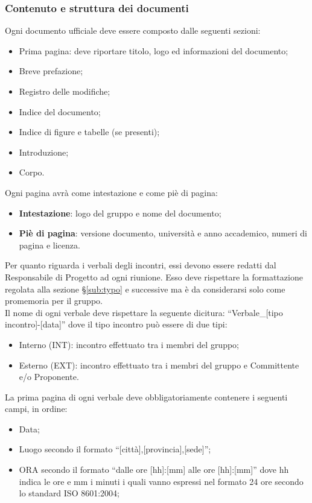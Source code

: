 {{	\subsubsection{Contenuto e struttura dei documenti}{
		\label{sub:content}
		Ogni documento ufficiale deve essere composto dalle seguenti sezioni:
		\begin{itemize}
			\item Prima pagina: deve riportare titolo, logo ed informazioni del documento;
			\item Breve prefazione;
			\item Registro delle modifiche;
			\item Indice del documento;
			\item Indice di figure e tabelle (se presenti);
			\item Introduzione;
			\item Corpo.
		\end{itemize}
		Ogni pagina avrà come intestazione e come piè di pagina:
		\begin{itemize}
			\item \textbf{Intestazione}: logo del gruppo e nome del documento;
			\item \textbf{Piè di pagina}: versione documento, università e anno accademico, numeri di pagina e licenza.
		\end{itemize}
		Per quanto riguarda i verbali degli incontri, essi devono essere redatti dal Responsabile di Progetto ad ogni riunione. Esso deve rispettare la formattazione regolata alla sezione \S\ref{sub:typo} e successive ma è da considerarsi solo come promemoria per il gruppo.\\
		Il nome di ogni verbale deve rispettare la seguente dicitura: “Verbale\_[tipo incontro]-[data]” dove il tipo incontro può essere di due tipi:
		\begin{itemize}
			\item Interno (INT): incontro effettuato tra i membri del gruppo;
			\item Esterno (EXT): incontro effettuato tra i membri del gruppo e Committente e/o Proponente.
		\end{itemize}
		La prima pagina di ogni verbale deve obbligatoriamente contenere i seguenti campi, in ordine:
		\begin{itemize}
			\item Data;
			\item Luogo secondo il formato “[città],[provincia],[sede]”;
			\item ORA secondo il formato “dalle ore [hh]:[mm] alle ore [hh]:[mm]” dove hh indica le ore e mm i minuti i quali vanno espressi nel formato 24 ore secondo lo standard ISO 8601:2004;

\end{itemize}}}}

